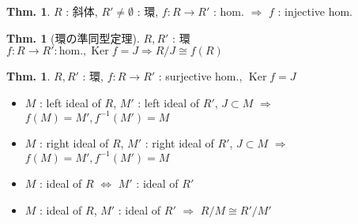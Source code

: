 \documentclass[uplatex,dvipdfmx,9pt]{beamer}
\newcommand{\inverse}[1]{#1^{-1}}
\newcommand{\Ker}{\operatorname{Ker}}
\newcounter{textThmCount}
\theoremstyle{definition} %
\newtheorem{thm}{Thm.}[subsection] %
\newtheorem{thmText}[textThmCount]{Thm.}
\theoremstyle{example}
\begin{document}
    \begin{frame}

      \begin{thm}
        $R$ : 斜体, $R' \neq \emptyset$ : 環, $f\colon R \to R'$ : hom. $\Rightarrow$ $f$ : injective hom.
      \end{thm}

      \begin{thmText}[環の準同型定理]
        $R, R'$ : 環 \\
        $f\colon R \to R' : \text{hom.}, \Ker f = J \Rightarrow R/J \cong f(R)$ 
      \end{thmText}

      \begin{thmText}
         $R, R'$ : 環, $f\colon R \to R'$ : surjective hom., $\Ker f = J$
        \begin{itemize}
          \item $M$ : left ideal of $R$, $M'$ : left ideal of $R'$, $J \subset M$ $\Rightarrow$ $f(M) = M', \inverse{f}(M') = M$
          \item $M$ : right ideal of $R$, $M'$ : right ideal of $R'$, $J \subset M$ $\Rightarrow$ $f(M) = M', \inverse{f}(M') = M$
          \item $M$ : ideal of $R$ $\Leftrightarrow$ $M'$ : ideal of $R'$
          \item $M$ : ideal of $R$, $M'$ : ideal of $R'$ $\Rightarrow$ $R/M \cong R'/M'$
        \end{itemize}       
      \end{thmText}
      
    \end{frame}
\end{document}
